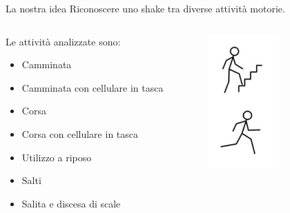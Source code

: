 \documentclass{beamer}
\begin{document}
\begin{frame}{La nostra idea}
Riconoscere uno shake tra diverse attività motorie.\\
\smallskip
\begin{columns}[T] %
\begin{column}{.48\textwidth}
Le attività analizzate sono:
\begin{itemize}
\item Camminata
\item Camminata con cellulare in tasca
\item Corsa
\item Corsa con cellulare in tasca
\item Utilizzo a riposo
\item Salti
\item Salita e discesa di scale
\end{itemize}
\end{column}%
\hfill%
\begin{column}{.4\textwidth}
\begin{figure}[H]
\includegraphics[width=0.6\textwidth]{./images/attivit.jpg}
\end{figure}
\end{column}%
\end{columns}
\end{frame}
\end{document}
